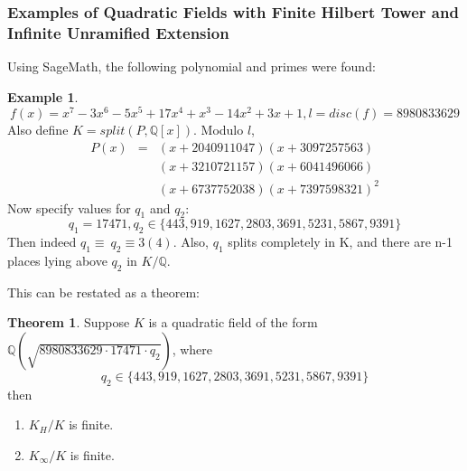 \documentclass[12pt]{extarticle}
\newcommand{\Q}{\mathbb{Q}}
\newcommand{\<}{\langle}
\renewcommand{\>}{\rangle}
\theoremstyle{definition}
\newtheorem{theorem}{Theorem}
\newtheorem{example}{Example}
\begin{document}
\subsubsection*{Examples of Quadratic Fields with Finite Hilbert Tower and Infinite Unramified Extension}
Using SageMath, the following polynomial and primes were found: 
\begin{example}
\begin{equation}
    f(x) = x^7-3x^6-5x^5+17x^4+x^3-14x^2+3x+1, l= disc(f)=8980833629
\end{equation}
Also define $K=split(P,\Q[x])$. Modulo $l$,
\begin{eqnarray*}
        P(x)&=&(x+2040911047)(x+3097257563)\\ & & {} (x+3210721157)(x+6041496066)\\ & & {}(x+6737752038)(x+7397598321)^2
\end{eqnarray*}
Now specify values for $q_1$ and $q_2$:
\begin{equation}
    q_1=17471,q_2\in\{443,919,1627,2803,3691,5231,5867,9391\}
\end{equation}
Then indeed $q_1\equiv\:q_2\equiv3(4)$. Also, $q_1$ splits completely in K, and there are n-1 places lying above $q_2$ in $K/\Q$.
\end{example}
This can be restated as a theorem:
\begin{theorem}
    Suppose $K$ is a quadratic field of the form $\Q(\sqrt{8980833629 \cdot 17471 \cdot q_2})$, where 
    \begin{equation}
        q_2\in\{443,919,1627,2803,3691,5231,5867,9391\}
    \end{equation}
    then \begin{enumerate}
        \item $K_H/K$ is finite.
        \item $K_\infty/K$ is finite.
    \end{enumerate}
\end{theorem}
\end{document}
